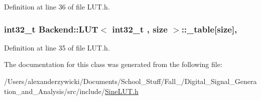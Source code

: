 Definition at line 36 of file L\+U\+T.\+h.

\hypertarget{classBackend_1_1LUT_ae70f3f0c9aaa9e0b85517d8e2c61d9a5}{
\subsubsection[{\+\_\+table}]{\setlength{\rightskip}{0pt plus 5cm}int32\+\_\+t  {\bf Backend\+::\+L\+U\+T}$<$ int32\+\_\+t , size $>$\+::\+\_\+table\mbox{[}size\mbox{]}\hspace{0.3cm}{\ttfamily [protected]}, {\ttfamily [inherited]}}}\label{classBackend_1_1LUT_ae70f3f0c9aaa9e0b85517d8e2c61d9a5}


Definition at line 35 of file L\+U\+T.\+h.



The documentation for this class was generated from the following file\+:\begin{DoxyCompactItemize}
\item 
/\+Users/alexanderzywicki/\+Documents/\+School\+\_\+\+Stuff/\+Fall\+\_/\+Digital\+\_\+\+Signal\+\_\+\+Generation\+\_\+and\+\_\+\+Analysis/src/include/\hyperlink{SineLUT_8h}{Sine\+L\+U\+T.\+h}\end{DoxyCompactItemize}
